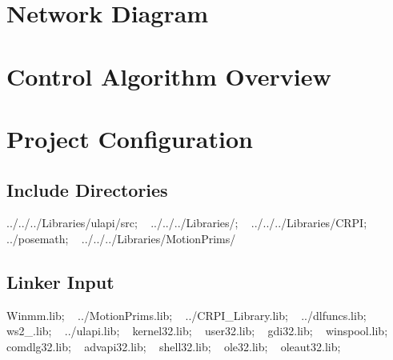 \hypertarget{index_network}{}\section{Network Diagram}\label{index_network}
 \hypertarget{index_overview}{}\section{Control Algorithm Overview}\label{index_overview}
    \hypertarget{index_config}{}\section{Project Configuration}\label{index_config}
\hypertarget{index_incl}{}\subsection{Include Directories}\label{index_incl}
../../../\+Libraries/ulapi/src; ~\newline
../../../\+Libraries/; ~\newline
../../../\+Libraries/\+C\+R\+PI; ~\newline
../posemath; ~\newline
../../../\+Libraries/\+Motion\+Prims/ ~\newline
~\newline
\hypertarget{index_lnk}{}\subsection{Linker Input}\label{index_lnk}
Winmm.\+lib; ~\newline
../\+Motion\+Prims.lib; ~\newline
../\+C\+R\+P\+I\+\_\+\+Library.lib; ~\newline
../dlfuncs.lib; ~\newline
ws2\+\_.\+lib; ~\newline
../ulapi.lib; ~\newline
kernel32.\+lib; ~\newline
user32.\+lib; ~\newline
gdi32.\+lib; ~\newline
winspool.\+lib; ~\newline
comdlg32.\+lib; ~\newline
advapi32.\+lib; ~\newline
shell32.\+lib; ~\newline
ole32.\+lib; ~\newline
oleaut32.\+lib; ~\newline
